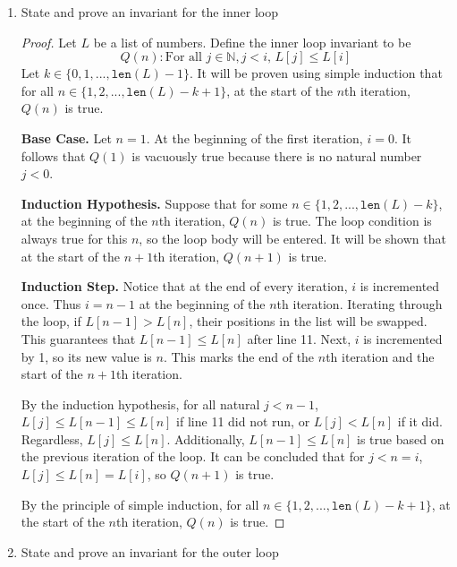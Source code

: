 \documentclass[11pt]{article}
\begin{document}
    \begin{enumerate}[label=(\alph*)]
        \item State and prove an invariant for the inner loop
        
        \begin{proof}
            Let \(L\) be a list of numbers. Define the inner loop invariant to be
            \[
                Q(n): \text{For all } j \in \mathbb{N}, j < i \text{, } L[j] \leq L[i]
            \]
            Let \(k \in \{0,1,..., \texttt{len}(L) - 1\}\). It will be proven using simple induction that for all \(n \in \{1, 2, ..., \texttt{len}(L) - k + 1\}\), at the start of the \(n\)th iteration, \(Q(n)\) is true.

            \textbf{Base Case.} Let \(n=1\). At the beginning of the first iteration, \(i = 0\). It follows that \(Q(1)\) is vacuously true because there is no natural number \(j < 0\).

            \textbf{Induction Hypothesis.} Suppose that for some \(n \in \{1, 2,..., \texttt{len}(L)-k\}\), at the beginning of the \(n\)th iteration, \(Q(n)\) is true. The loop condition is always true for this \(n\), so the loop body will be entered. It will be shown that at the start of the \(n+1\)th iteration, \(Q(n+1)\) is true.

            \textbf{Induction Step.} Notice that at the end of every iteration, \(i\) is incremented once. Thus \(i = n - 1\) at the beginning of the \(n\)th iteration. Iterating through the loop, if \(L[n-1] > L[n]\), their positions in the list will be swapped. This guarantees that \(L[n-1] \leq L[n]\) after line 11. Next, \(i\) is incremented by 1, so its new value is \(n\). This marks the end of the \(n\)th iteration and the start of the \(n+1\)th iteration.

            By the induction hypothesis, for all natural \(j < n-1\), \(L[j] \leq L[n-1] \leq L[n]\) if line 11 did not run, or \(L[j] < L[n]\) if it did. Regardless, \(L[j] \leq L[n]\). Additionally, \(L[n-1] \leq L[n]\) is true based on the previous iteration of the loop. It can be concluded that for \(j < n = i\), \(L[j] \leq L[n] = L[i]\), so \(Q(n+1)\) is true.

            By the principle of simple induction, for all \(n \in \{1, 2, ..., \texttt{len}(L) - k + 1\}\), at the start of the \(n\)th iteration, \(Q(n)\) is true.

        \end{proof}
        \item State and prove an invariant for the outer loop
        

\end{enumerate}
\end{document}
